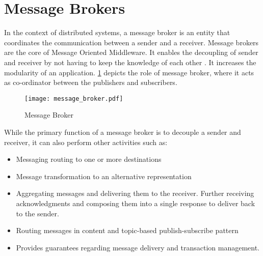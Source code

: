 \section{Message Brokers}

In the context of distributed systems, a message broker is an entity that coordinates the communication between a sender and a receiver. Message brokers are the core of Message Oriented Middleware. It enables the decoupling of sender and receiver by not having to keep the knowledge of each other \parencite{message_brokers}. It increases the modularity of an application. \ref{figures:message_broker} depicts the role of message broker, where it acts as co-ordinator between the publishers and subscribers.

\makeatletter
\setlength{\intextsep}{25pt}
\makeatother

\begin{figure}[h]
\centering
\texttt{[image: message\_broker.pdf]}
\caption{Message Broker}\label{figures:message_broker}
\end{figure}

While the primary function of a message broker is to decouple a sender and receiver, it can also perform other activities \parencite{message_brokers_usage} such as:

\begin{itemize}
  \item Messaging routing to one or more destinations
  \item Message transformation to an alternative representation
  \item Aggregating messages and delivering them to the receiver. Further receiving acknowledgments and composing them into a single response to deliver back to the sender.
  \item Routing messages in content and topic-based publish-subscribe pattern
  \item Provides guarantees regarding message delivery and transaction management.
\end{itemize}